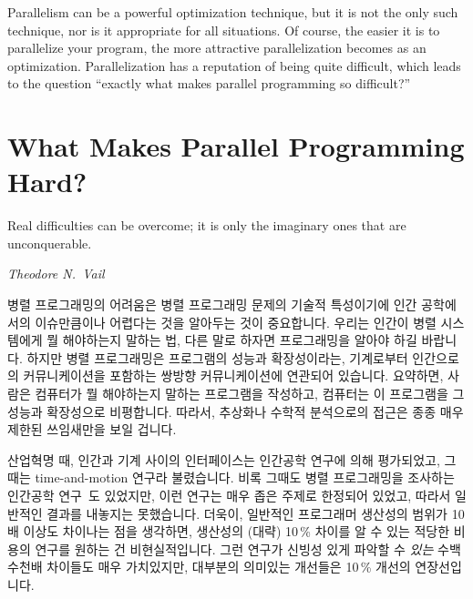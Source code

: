 Parallelism can be a powerful optimization technique, but
it is not the only such technique, nor is it appropriate for all
situations.
Of course, the easier it is to parallelize your program, the
more attractive parallelization becomes as an optimization.
Parallelization has a reputation of being quite difficult,
which leads to the question ``exactly what makes parallel
programming so difficult?''
\fi

\section{What Makes Parallel Programming Hard?}
\label{sec:intro:What Makes Parallel Programming Hard?}
%
\epigraph{Real difficulties can be overcome; it is only the imaginary
	  ones that are unconquerable.}{\emph{Theodore N.~Vail}}


병렬 프로그래밍의 어려움은 병렬 프로그래밍 문제의 기술적 특성이기에 인간
공학에서의 이슈만큼이나 어렵다는 것을 알아두는 것이 중요합니다.
우리는 인간이 병렬 시스템에게 뭘 해야하는지 말하는 법, 다른 말로 하자면
프로그래밍을 알아야 하길 바랍니다.
하지만 병렬 프로그래밍은 프로그램의 성능과 확장성이라는, 기계로부터 인간으로의
커뮤니케이션을 포함하는 쌍방향 커뮤니케이션에 연관되어 있습니다.
요약하면, 사람은 컴퓨터가 뭘 해야하는지 말하는 프로그램을 작성하고, 컴퓨터는 이
프로그램을 그 성능과 확장성으로 비평합니다.
따라서, 추상화나 수학적 분석으로의 접근은 종종 매우 제한된 쓰임새만을 보일
겁니다.

산업혁명 때, 인간과 기계 사이의 인터페이스는 인간공학 연구에 의해 평가되었고,
그때는 time-and-motion 연구라 불렸습니다.
비록 그때도 병렬 프로그래밍을 조사하는 인간공학
연구~\cite{RyanEccles2005HPCSNovice,RyanEccles2006HPCSNoviceNeeds,
LorinHochstein2005SC,DuaneSzafron1994PEMPDS}도
있었지만, 이런 연구는 매우 좁은 주제로 한정되어 있었고, 따라서 일반적인 결과를
내놓지는 못했습니다.
더욱이, 일반적인 프로그래머 생산성의 범위가 10배 이상도 차이나는 점을 생각하면,
생산성의 (대략) 10\,\% 차이를 알 수 있는 적당한 비용의 연구를 원하는 건
비현실적입니다.
그런 연구가 신빙성 있게 파악할 수 \emph{있는} 수백 수천배 차이들도 매우
가치있지만, 대부분의 의미있는 개선들은 10\,\% 개선의 연장선입니다.

